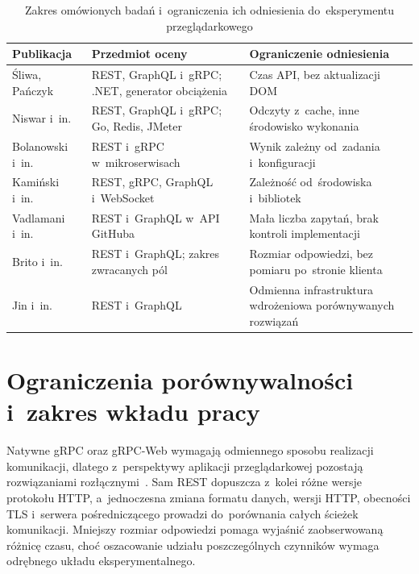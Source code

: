 \begin{table}[htbp]
\centering
\small
\caption{Zakres omówionych badań i~ograniczenia ich odniesienia do~eksperymentu przeglądarkowego}
\label{tab:StanBadan}
\renewcommand{\arraystretch}{1.15}
\begin{tabular}{|p{}|p{}|p{}|}
\hline
\textbf{Publikacja} & \textbf{Przedmiot oceny} & \textbf{Ograniczenie odniesienia} \\
\hline
Śliwa, Pańczyk~\cite{bib:SliwaPanczyk2021} & REST, GraphQL i~gRPC; .NET, generator obciążenia & Czas API, bez aktualizacji DOM \\
\hline
Niswar i~in.~\cite{bib:Niswar2024} & REST, GraphQL i~gRPC; Go, Redis, JMeter & Odczyty z~cache, inne środowisko wykonania \\
\hline
Bolanowski i~in.~\cite{bib:Bolanowski2022} & REST i~gRPC w~mikroserwisach & Wynik zależny od~zadania i~konfiguracji \\
\hline
Kamiński i~in.~\cite{bib:Kaminski2023} & REST, gRPC, GraphQL i~WebSocket & Zależność od~środowiska i~bibliotek \\
\hline
Vadlamani i~in.~\cite{bib:Vadlamani2021} & REST i~GraphQL w~API GitHuba & Mała liczba zapytań, brak kontroli implementacji \\
\hline
Brito i~in.~\cite{bib:Brito2019} & REST i~GraphQL; zakres zwracanych pól & Rozmiar odpowiedzi, bez pomiaru po~stronie klienta \\
\hline
Jin i~in.~\cite{bib:Jin2025} & REST i~GraphQL & Odmienna infrastruktura wdrożeniowa porównywanych rozwiązań \\
\hline
\end{tabular}
\end{table}

\section{Ograniczenia porównywalności i~zakres wkładu pracy}
\label{sec:LukaBadawcza}

Natywne gRPC oraz gRPC-Web wymagają odmiennego sposobu realizacji komunikacji, dlatego z~perspektywy aplikacji przeglądarkowej pozostają rozwiązaniami rozłącznymi~\cite{bib:gRPCWeb,bib:ProtocolWeb}. Sam REST dopuszcza z~kolei różne wersje protokołu HTTP, a~jednoczesna zmiana formatu danych, wersji HTTP, obecności TLS i~serwera pośredniczącego prowadzi do~porównania całych ścieżek komunikacji. Mniejszy rozmiar odpowiedzi pomaga wyjaśnić zaobserwowaną różnicę czasu, choć oszacowanie udziału poszczególnych czynników wymaga odrębnego układu eksperymentalnego.
